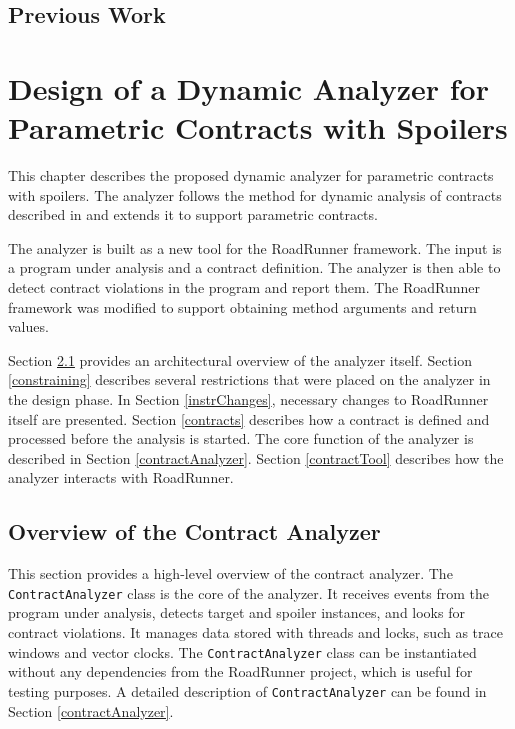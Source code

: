 \section{Previous Work}

{\color{blue}\lipsum[1-3]}



\chapter{Design of a Dynamic Analyzer for Parametric Contracts with Spoilers}
\label{chFour}

This chapter describes the proposed dynamic analyzer for parametric contracts
with spoilers. The analyzer follows the method for dynamic analysis of contracts
described in \cite{contracts} and extends it to support parametric contracts.

The analyzer is built as a new tool for the RoadRunner framework. The input is a
program under analysis and a contract definition. The analyzer is then able to
detect contract violations in the program and report them. The RoadRunner
framework was modified to support obtaining method arguments and return values.

Section \ref{overview} provides an architectural overview of the analyzer
itself. Section \ref{constraining} describes several restrictions that were
placed on the analyzer in the design phase. In Section \ref{instrChanges},
necessary changes to RoadRunner itself are presented. Section \ref{contracts}
describes how a contract is defined and processed before the analysis is
started. The core function of the analyzer is described in Section
\ref{contractAnalyzer}. Section \ref{contractTool} describes how the analyzer
interacts with RoadRunner.

\section{Overview of the Contract Analyzer}
\label{overview}

This section provides a high-level overview of the contract analyzer. The
\texttt{ContractAnalyzer} class is the core of the analyzer. It receives events
from the program under analysis, detects target and spoiler instances, and looks
for contract violations. It manages data stored with threads and locks, such as
trace windows and vector clocks. The \texttt{ContractAnalyzer} class can be
instantiated without any dependencies from the RoadRunner project, which is
useful for testing purposes. A detailed description of \texttt{ContractAnalyzer}
can be found in Section \ref{contractAnalyzer}.

